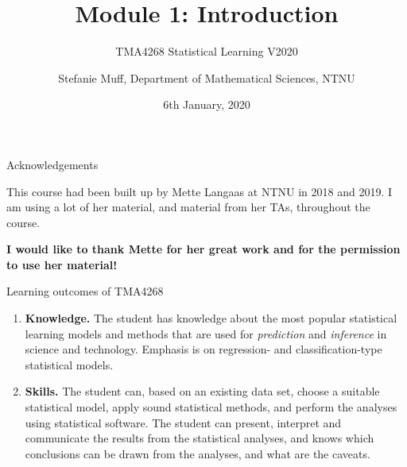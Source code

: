 \documentclass[10pt,ignorenonframetext,]{beamer}
\title{Module 1: Introduction}
\subtitle{TMA4268 Statistical Learning V2020}
\author{Stefanie Muff, Department of Mathematical Sciences, NTNU}
\date{6th January, 2020}
\begin{document}
\frame{\titlepage}

\begin{frame}{Acknowledgements}

This course had been built up by Mette Langaas at NTNU in 2018 and 2019.
I am using a lot of her material, and material from her TAs, throughout
the course.

\textbf{I would like to thank Mette for her great work and for the
permission to use her material!}

\end{frame}

\begin{frame}{Learning outcomes of TMA4268}

\begin{enumerate}
\def\labelenumi{\arabic{enumi}.}
\item
  \textbf{Knowledge.} The student has knowledge about the most popular
  statistical learning models and methods that are used for
  \emph{prediction} and \emph{inference} in science and technology.
  Emphasis is on regression- and classification-type statistical models.
\item
  \textbf{Skills.} The student can, based on an existing data set,
  choose a suitable statistical model, apply sound statistical methods,
  and perform the analyses using statistical software. The student can
  present, interpret and communicate the results from the statistical
  analyses, and knows which conclusions can be drawn from the analyses,
  and what are the caveats.
\end{enumerate}

\end{frame}
\end{document}

